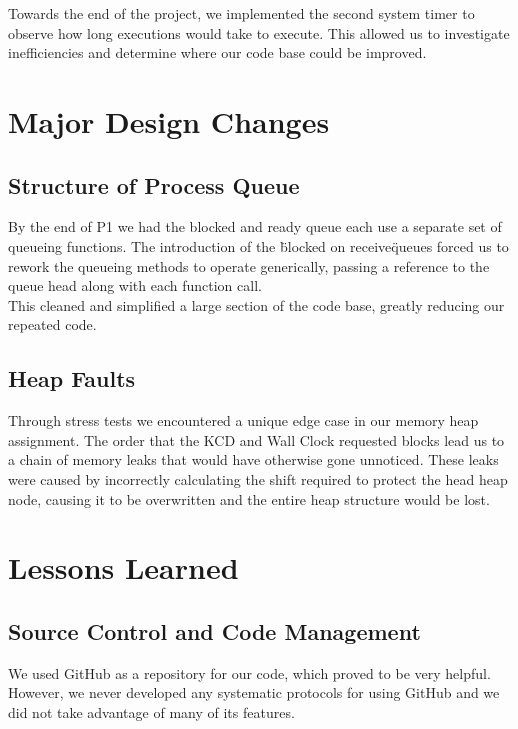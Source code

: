 \documentclass[12pt]{report}
\begin{document}
Towards the end of the project, we implemented the second system timer to observe how long executions would take to execute. This allowed us to investigate inefficiencies and determine where our code base could be improved.\\

\chapter{Major Design Changes}


\section{Structure of Process Queue}

By the end of P1 we had the blocked and ready queue each use a separate set of queueing functions. The introduction of the \"blocked on receive\" queues forced us to rework the queueing methods to operate generically, passing a reference to the queue head along with each function call.\\
This cleaned and simplified a large section of the code base, greatly reducing our repeated code.\\

\section{Heap Faults}
Through stress tests we encountered a unique edge case in our memory heap assignment. The order that the KCD and Wall Clock requested blocks lead us to a chain of memory leaks that would have otherwise gone unnoticed. These leaks were caused by incorrectly calculating the shift required to protect the head heap node, causing it to be overwritten and the entire heap structure would be lost.




\chapter{Lessons Learned}

\section{Source Control and Code Management}

We used GitHub as a repository for our code, which proved to be very helpful. However, we never developed any systematic protocols for using GitHub and we did not take advantage of many of its features.\\
\end{document}
